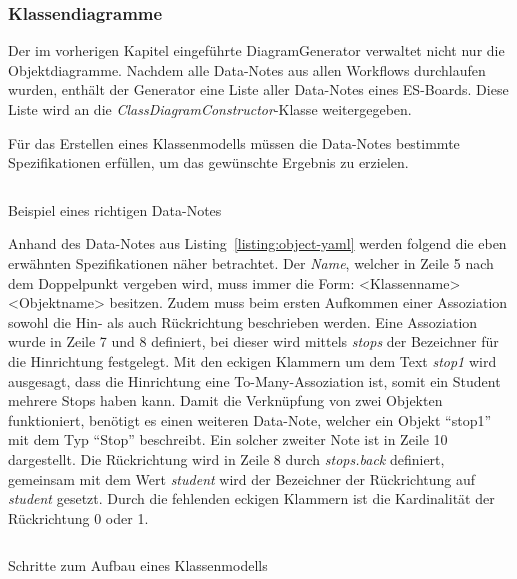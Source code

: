 \subsubsection{Klassendiagramme}
Der im vorherigen Kapitel eingeführte DiagramGenerator verwaltet nicht nur die Objektdiagramme.
Nachdem alle Data-Notes aus allen Workflows durchlaufen wurden, enthält der Generator eine Liste aller Data-Notes eines \ac{ES}-Boards.
Diese Liste wird an die \textit{ClassDiagramConstructor}-Klasse weitergegeben.

Für das Erstellen eines Klassenmodells müssen die Data-Notes bestimmte Spezifikationen erfüllen, um das gewünschte Ergebnis zu erzielen.

\begin{listing}[!ht]
    \inputminted[firstnumber=5]{yaml}{listings/3.1.4/data.es.yaml}
    \caption{Beispiel eines richtigen Data-Notes}
    \label{listing:object-yaml}
\end{listing}

Anhand des Data-Notes aus Listing~\ref{listing:object-yaml} werden folgend die eben erwähnten Spezifikationen näher betrachtet.
Der \textit{Name}, welcher in Zeile 5 nach dem Doppelpunkt vergeben wird, muss immer die Form: <Klassenname> <Objektname> besitzen.
Zudem muss beim ersten Aufkommen einer Assoziation sowohl die Hin- als auch Rückrichtung beschrieben werden.
Eine Assoziation wurde in Zeile 7 und 8 definiert, bei dieser wird mittels \textit{stops} der Bezeichner für die Hinrichtung festgelegt.
Mit den eckigen Klammern um dem Text \textit{stop1} wird ausgesagt, dass die Hinrichtung eine To-Many-Assoziation ist, somit ein Student mehrere Stops haben kann.
Damit die Verknüpfung von zwei Objekten funktioniert, benötigt es einen weiteren Data-Note, welcher ein Objekt ``stop1'' mit dem Typ ``Stop'' beschreibt.
Ein solcher zweiter Note ist in Zeile 10 dargestellt.
Die Rückrichtung wird in Zeile 8 durch \textit{stops.back} definiert, gemeinsam mit dem Wert \textit{student} wird der Bezeichner
der Rückrichtung auf \textit{student} gesetzt.
Durch die fehlenden eckigen Klammern ist die Kardinalität der Rückrichtung 0 oder 1.

\begin{listing}[!ht]
    \inputminted[firstnumber=39]{java}{listings/3.1.4/ClassProcedure.java}
    \caption{Schritte zum Aufbau eines Klassenmodells}
    \label{listing:class-procedure}
\end{listing}

